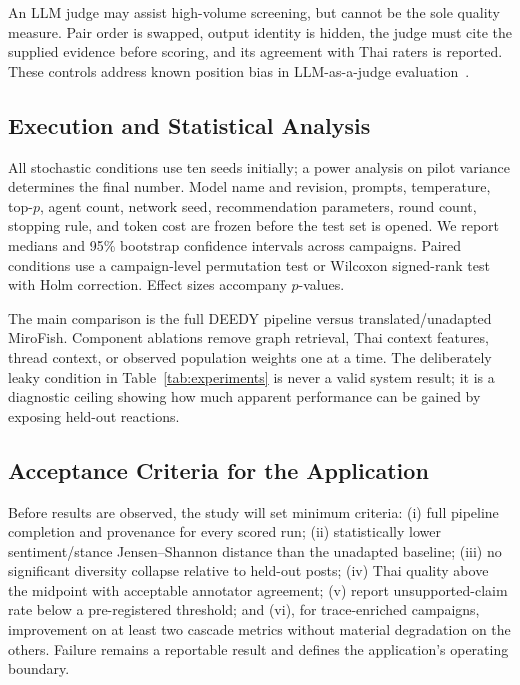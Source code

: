 \documentclass[conference]{IEEEtran}
\begin{document}
An LLM judge may assist high-volume screening, but cannot be the sole quality
measure. Pair order is swapped, output identity is hidden, the judge must cite
the supplied evidence before scoring, and its agreement with Thai raters is
reported. These controls address known position bias in LLM-as-a-judge
evaluation~\cite{shi2024judging}.

\subsection{Execution and Statistical Analysis}

All stochastic conditions use ten seeds initially; a power analysis on pilot
variance determines the final number. Model name and revision, prompts,
temperature, top-$p$, agent count, network seed, recommendation parameters,
round count, stopping rule, and token cost are frozen before the test set is
opened. We report medians and 95\% bootstrap confidence intervals across
campaigns. Paired conditions use a campaign-level permutation test or Wilcoxon
signed-rank test with Holm correction. Effect sizes accompany $p$-values.

The main comparison is the full DEEDY pipeline versus translated/unadapted
MiroFish. Component ablations remove graph retrieval, Thai context features,
thread context, or observed population weights one at a time. The deliberately
leaky condition in Table~\ref{tab:experiments} is never a valid system result;
it is a diagnostic ceiling showing how much apparent performance can be gained
by exposing held-out reactions.

\subsection{Acceptance Criteria for the Application}

Before results are observed, the study will set minimum criteria: (i) full
pipeline completion and provenance for every scored run; (ii) statistically
lower sentiment/stance Jensen--Shannon distance than the unadapted baseline;
(iii) no significant diversity collapse relative to held-out posts; (iv) Thai
quality above the midpoint with acceptable annotator agreement; (v) report
unsupported-claim rate below a pre-registered threshold; and (vi), for
trace-enriched campaigns, improvement on at least two cascade metrics without
material degradation on the others. Failure remains a reportable result and
defines the application's operating boundary.
\end{document}
